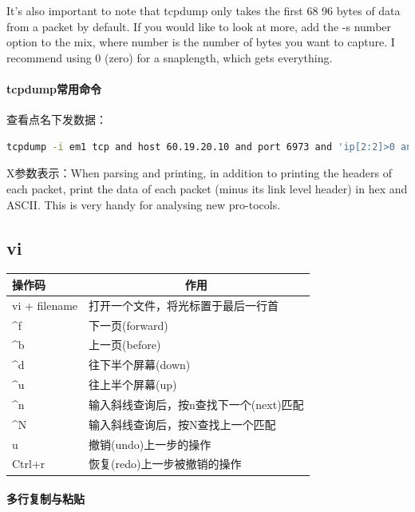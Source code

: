 \documentclass{book}
\begin{document}
It’s also important to note that tcpdump only takes the first 68 96 bytes of data from a packet by default. 
If you would like to look at more, add the -s number option to the mix, where number is the number of bytes you want to capture. 
I recommend using 0 (zero) for a snaplength, which gets everything. 

\paragraph{tcpdump常用命令}

查看点名下发数据：

\begin{lstlisting}[language=Bash]
tcpdump -i em1 tcp and host 60.19.20.10 and port 6973 and 'ip[2:2]>0 and ip[41:2]=0x8201' -vv -X -c 100
\end{lstlisting}

X参数表示：When parsing and printing, 
in addition to printing the headers of each packet, 
print the data of each packet (minus its link level header) in hex and ASCII.  
This is very handy for analysing new pro-tocols.

\subsection{vi}

\begin{tabular}{l|p{10cm}}
	\multirow{1}{*}{操作码}			
	& \multicolumn{1}{c}{作用}\\	 
	\hline
	vi + filename & 打开一个文件，将光标置于最后一行首\\
	\hline
	\textasciicircum f & 下一页(forward)\\
	\hline 
	\textasciicircum b & 上一页(before)\\
	\hline
	\textasciicircum d & 往下半个屏幕(down)\\
	\hline
	\textasciicircum u & 往上半个屏幕(up)\\
	\hline
	\textasciicircum n & 输入斜线查询后，按n查找下一个(next)匹配\\
	\hline
	\textasciicircum N & 输入斜线查询后，按N查找上一个匹配\\
	\hline
	u & 撤销(undo)上一步的操作\\
	\hline
	Ctrl+r & 恢复(redo)上一步被撤销的操作\\
	\hline
\end{tabular}

\paragraph{多行复制与粘贴}
\end{document}
